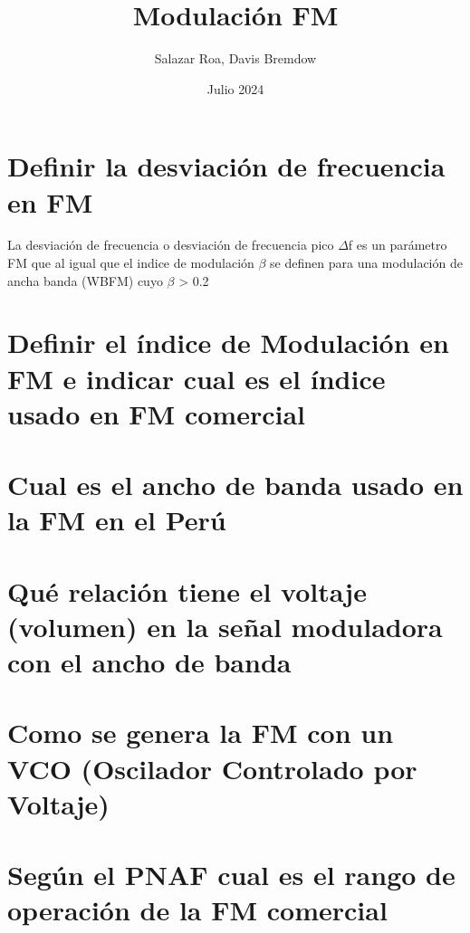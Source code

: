 \documentclass{article}
\title{Modulación FM}
\author{Salazar Roa, Davis Bremdow}
\date{ Julio 2024}
\begin{document}
	\maketitle
	\newpage
	\section{Definir la desviación de frecuencia en FM}
	La desviación de frecuencia o desviación de frecuencia pico $\Delta$f es un parámetro FM que al igual que el indice de modulación $\beta$ se definen para una modulación de ancha banda (WBFM) cuyo $\beta$ > 0.2
		
	\section{Definir el índice de Modulación en FM e indicar cual es el índice usado en FM comercial}
	
	\section{Cual es el ancho de banda usado en la FM en el Perú}
	
	\section{Qué relación tiene el voltaje (volumen) en la señal moduladora con el ancho de banda}
	
	\section{Como se genera la FM con un VCO (Oscilador Controlado por Voltaje)}
	
	\section{Según el PNAF cual es el rango de operación de la FM comercial}
\end{document}
